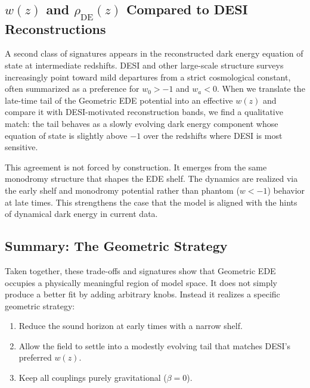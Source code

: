 \documentclass[a4paper,11pt]{article}
\begin{document}

\subsection{$w(z)$ and $\rho_{\mathrm{DE}}(z)$ Compared to DESI Reconstructions}
\label{sec:wz_desi}

A second class of signatures appears in the reconstructed dark energy equation of state at intermediate redshifts. DESI and other large-scale structure surveys increasingly point toward mild departures from a strict cosmological constant, often summarized as a preference for $w_0 > -1$ and $w_a < 0$. When we translate the late-time tail of the Geometric EDE potential into an effective $w(z)$ and compare it with DESI-motivated reconstruction bands, we find a qualitative match: the tail behaves as a slowly evolving dark energy component whose equation of state is slightly above $-1$ over the redshifts where DESI is most sensitive.

This agreement is not forced by construction. It emerges from the same monodromy structure that shapes the EDE shelf. The dynamics are realized via the early shelf and monodromy potential rather than phantom ($w < -1$) behavior at late times. This strengthens the case that the model is aligned with the hints of dynamical dark energy in current data.


\subsection{Summary: The Geometric Strategy}
\label{sec:geometric_summary}

Taken together, these trade-offs and signatures show that Geometric EDE occupies a physically meaningful region of model space. It does not simply produce a better fit by adding arbitrary knobs. Instead it realizes a specific geometric strategy:
\begin{enumerate}
    \item Reduce the sound horizon at early times with a narrow shelf.
    \item Allow the field to settle into a modestly evolving tail that matches DESI's preferred $w(z)$.
    \item Keep all couplings purely gravitational ($\beta = 0$).
\end{enumerate}
\end{document}
